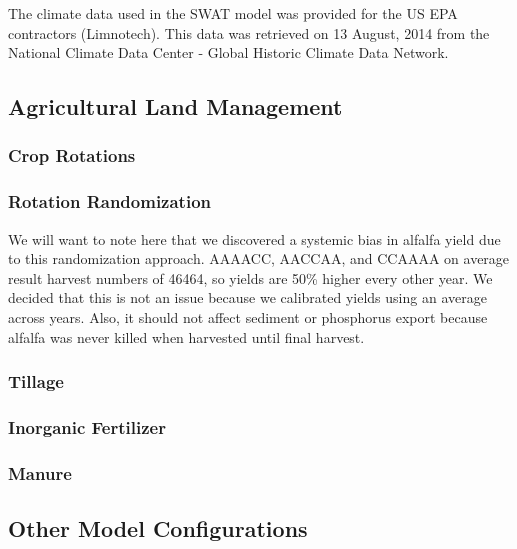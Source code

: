 \documentclass[10pt,letterpaper]{article}%
\begin{document}
		The climate data used in the SWAT model was provided for the US EPA contractors (Limnotech). This data was retrieved on 13 August, 2014 from the National Climate Data Center - Global Historic Climate Data Network.
	\pagebreak
	\subsection{Agricultural Land Management}
		\subsubsection{Crop Rotations}
		\subsubsection{Rotation Randomization}
			We will want to note here that we discovered a systemic bias in alfalfa yield due to this randomization approach. AAAACC, AACCAA, and CCAAAA on average result harvest numbers of 46464, so yields are 50\% higher every other year. We decided that this is not an issue because we calibrated yields using an average across years. Also, it should not affect sediment or phosphorus export because alfalfa was never killed when harvested until final harvest.		
		\subsubsection{Tillage}
		\subsubsection{Inorganic Fertilizer}
		\subsubsection{Manure}
	\pagebreak
	\subsection{Other Model Configurations}
\end{document}
